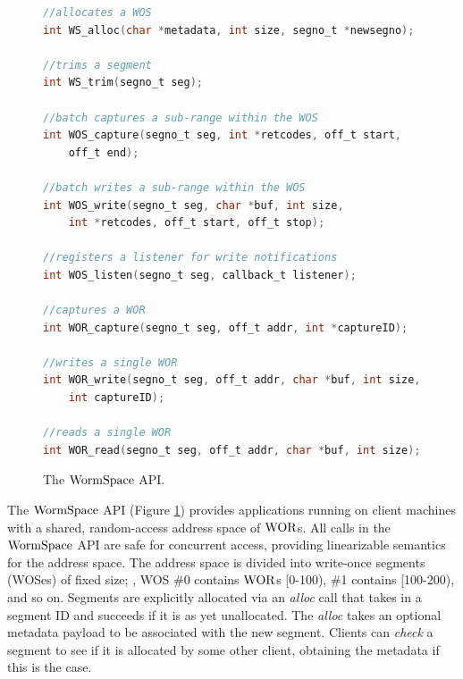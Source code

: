 %
%
%

\begin{figure}

\begin{lstlisting}[language=C]
//allocates a WOS
int WS_alloc(char *metadata, int size, segno_t *newsegno);

//trims a segment
int WS_trim(segno_t seg); 

//batch captures a sub-range within the WOS
int WOS_capture(segno_t seg, int *retcodes, off_t start,
    off_t end);

//batch writes a sub-range within the WOS
int WOS_write(segno_t seg, char *buf, int size,
    int *retcodes, off_t start, off_t stop);

//registers a listener for write notifications
int WOS_listen(segno_t seg, callback_t listener);

//captures a WOR
int WOR_capture(segno_t seg, off_t addr, int *captureID);

//writes a single WOR
int WOR_write(segno_t seg, off_t addr, char *buf, int size,
    int captureID);

//reads a single WOR
int WOR_read(segno_t seg, off_t addr, char *buf, int size);
\end{lstlisting}
\caption{The $\mathrm{WormSpace}$ API.}
\label{fig:chapter:multipaxos:api}
\end{figure}



The $\mathrm{WormSpace}$ API (Figure \ref{fig:chapter:multipaxos:api}) provides applications running on client machines with a shared, 
random-access address space of $\mathrm{WOR}$s. 
All calls in the $\mathrm{WormSpace}$ API are safe for concurrent access, providing linearizable semantics for the address space. 
The address space is divided into write-once segments (WOSes) of fixed size; 
\ie, WOS \#0 contains $\mathrm{WOR}$s [0-100), \#1 contains [100-200), and so on. 
Segments are explicitly allocated via an \textit{alloc} call that takes in a segment ID and succeeds if it is as yet unallocated. 
The \textit{alloc} takes an optional metadata payload to be associated with the new segment.
 Clients can \textit{check} a segment to see if it is allocated by some other client, obtaining the metadata if this is the case. 

